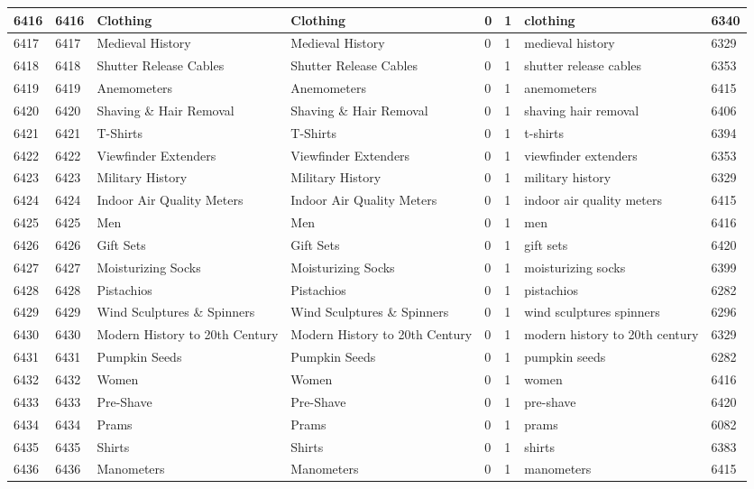 \begin{longtable}{|l|l|l|l|l|l|l|l|}
6416 & 6416 & Clothing & Clothing & 0 & 1 & clothing & 6340 \\ \hline 
6417 & 6417 & Medieval History & Medieval History & 0 & 1 & medieval history & 6329 \\ \hline 
6418 & 6418 & Shutter Release Cables & Shutter Release Cables & 0 & 1 & shutter release cables & 6353 \\ \hline 
6419 & 6419 & Anemometers & Anemometers & 0 & 1 & anemometers & 6415 \\ \hline 
6420 & 6420 & Shaving \& Hair Removal & Shaving \& Hair Removal & 0 & 1 & shaving hair removal & 6406 \\ \hline 
6421 & 6421 & T-Shirts & T-Shirts & 0 & 1 & t-shirts & 6394 \\ \hline 
6422 & 6422 & Viewfinder Extenders & Viewfinder Extenders & 0 & 1 & viewfinder extenders & 6353 \\ \hline 
6423 & 6423 & Military History & Military History & 0 & 1 & military history & 6329 \\ \hline 
6424 & 6424 & Indoor Air Quality Meters & Indoor Air Quality Meters & 0 & 1 & indoor air quality meters & 6415 \\ \hline 
6425 & 6425 & Men & Men & 0 & 1 & men & 6416 \\ \hline 
6426 & 6426 & Gift Sets & Gift Sets & 0 & 1 & gift sets & 6420 \\ \hline 
6427 & 6427 & Moisturizing Socks & Moisturizing Socks & 0 & 1 & moisturizing socks & 6399 \\ \hline 
6428 & 6428 & Pistachios & Pistachios & 0 & 1 & pistachios & 6282 \\ \hline 
6429 & 6429 & Wind Sculptures \& Spinners & Wind Sculptures \& Spinners & 0 & 1 & wind sculptures spinners & 6296 \\ \hline 
6430 & 6430 & Modern History to 20th Century & Modern History to 20th Century & 0 & 1 & modern history to 20th century & 6329 \\ \hline 
6431 & 6431 & Pumpkin Seeds & Pumpkin Seeds & 0 & 1 & pumpkin seeds & 6282 \\ \hline 
6432 & 6432 & Women & Women & 0 & 1 & women & 6416 \\ \hline 
6433 & 6433 & Pre-Shave & Pre-Shave & 0 & 1 & pre-shave & 6420 \\ \hline 
6434 & 6434 & Prams & Prams & 0 & 1 & prams & 6082 \\ \hline 
6435 & 6435 & Shirts & Shirts & 0 & 1 & shirts & 6383 \\ \hline 
6436 & 6436 & Manometers & Manometers & 0 & 1 & manometers & 6415 \\ \hline 

\end{longtable}
